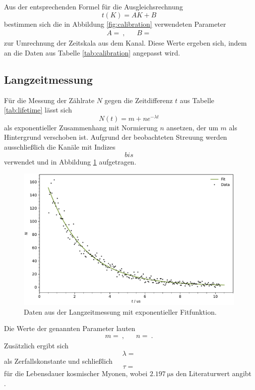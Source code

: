 Aus der entsprechenden Formel für die Ausgleichsrechnung
\begin{equation*}
	t(K) = AK + B
\end{equation*}
bestimmen sich die in Abbildung \ref{fig:calibration} verwendeten Parameter
\begin{align*}
	A =  \: , && B = 
\end{align*}
zur Umrechnung der Zeitskala aus dem Kanal. Diese Werte ergeben sich, indem an die Daten aus Tabelle \ref{tab:calibration}
angepasst wird.



\subsection{Langzeitmessung}

Für die Messung der Zählrate $N$ gegen die Zeitdifferenz $t$ aus Tabelle \ref{tab:lifetime} lässt sich
\begin{equation*}
	N(t) = m + ne^{-\lambda t}
\end{equation*}
als exponentieller Zusammenhang mit Normierung $n$ ansetzen, der um $m$ als Hintergrund verschoben ist. Aufgrund der
beobachteten Streuung werden ausschließlich die Kanäle mit Indizes $$ bis $$
verwendet und in Abbildung \ref{fig:lifetime} aufgetragen.

\begin{figure}[H]
	\centering
	\includegraphics[width=\textwidth]{build/lifetime.pdf}
	\caption{Daten aus der Langzeitmessung mit exponentieller Fitfunktion.}
	\label{fig:lifetime}
\end{figure}

Die Werte der genannten Parameter lauten
\begin{align*}
	m =  \: , && n =  \: .
\end{align*}
Zusätzlich ergibt sich
\begin{equation*}
	\lambda = 
\end{equation*}
als Zerfallskonstante und schließlich
\begin{equation*}
	\tau = 
\end{equation*}
für die Lebensdauer kosmischer Myonen, wobei $\qty{2.197}{\micro\second}$ den Literaturwert angibt \cite{Tishchenko_2013}.




